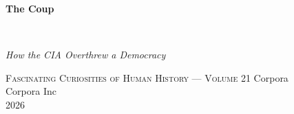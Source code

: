 \clearpage
\vspace*{1.5in}
\begin{center}
  \begin{minipage}{\textwidth}
    \centering
    \Huge\bfseries
    \linespread{1.25}\selectfont
    The Coup
  \end{minipage}
  \\[3em]
  {\Large\itshape\linespread{1.3}\selectfont
  How the CIA Overthrew a Democracy\par}
  \vspace{2em}
  {\small\scshape Fascinating Curiosities of Human History — Volume 21}
  \vfill
  {\large Corpora}
  \\[1em]
  {\large Corpora Inc}
  \\[1em]
  {\large 2026}
\end{center}
\clearpage
